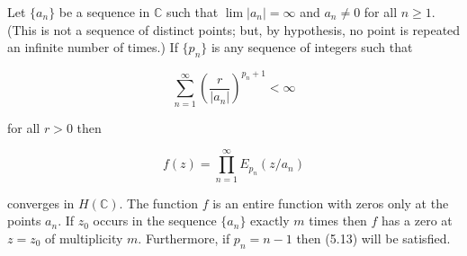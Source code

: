Let $\{a_n\}$ be a sequence in $\mathbb{C}$ such that $\lim |a_n| = \infty$ and $a_n \neq 0$ for all $n \geq 1$. (This is not a sequence of distinct points; but, by hypothesis, no point is repeated an infinite number of times.) If $\{p_n\}$ is any sequence of integers such that

$$\sum_{n=1}^{\infty} \left( \frac{r}{|a_n|} \right)^{p_n+1} < \infty$$

for all $r > 0$ then

$$f(z) = \prod_{n=1}^{\infty} E_{p_n}(z/a_n)$$

converges in $H(\mathbb{C})$. The function $f$ is an entire function with zeros only at the points $a_n$. If $z_0$ occurs in the sequence $\{a_n\}$ exactly $m$ times then $f$ has a zero at $z = z_0$ of multiplicity $m$. Furthermore, if $p_n = n-1$ then (5.13) will be satisfied.
